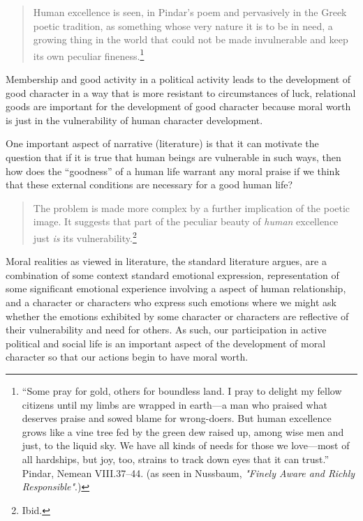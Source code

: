 \documentclass[
  12pt,
]{book}
\theoremstyle{definition}
\theoremstyle{definition}
\theoremstyle{definition}
\theoremstyle{definition}
\theoremstyle{remark}
\begin{document}
\begin{quote}
Human excellence is seen, in Pindar's poem and pervasively in the Greek poetic tradition, as something whose very nature it is to be in need, a growing thing in the world that could not be made invulnerable and keep its own peculiar fineness.\footnote{``Some pray for gold, others for boundless land. I pray to delight my fellow citizens until my limbs are wrapped in earth---a man who praised what deserves praise and sowed blame for wrong-doers. But human excellence grows like a vine tree fed by the green dew raised up, among wise men and just, to the liquid sky. We have all kinds of needs for those we love---most of all hardships, but joy, too, strains to track down eyes that it can trust.'' Pindar, Nemean VIII.37--44. (as seen in Nussbaum, \emph{"{Finely Aware} and {Richly Responsible}"}.)}
\end{quote}

Membership and good activity in a political activity leads to the development of good character in a way that is more resistant to circumstances of luck, relational goods are important for the development of good character because moral worth is just in the vulnerability of human character development.

One important aspect of narrative (literature) is that it can motivate the question that if it is true that human beings are vulnerable in such ways, then how does the ``goodness'' of a human life warrant any moral praise if we think that these external conditions are necessary for a good human life?

\begin{quote}
The problem is made more complex by a further implication of the poetic image. It suggests that part of the peculiar beauty of \emph{human} excellence just \emph{is} its vulnerability.\footnote{Ibid.}
\end{quote}

Moral realities as viewed in literature, the standard literature argues, are a combination of some context standard emotional expression, representation of some significant emotional experience involving a aspect of human relationship, and a character or characters who express such emotions where we might ask whether the emotions exhibited by some character or characters are reflective of their vulnerability and need for others. As such, our participation in active political and social life is an important aspect of the development of moral character so that our actions begin to have moral worth.
\end{document}
